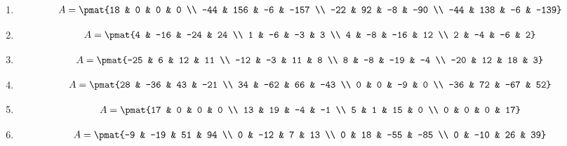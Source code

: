 \begin{enumerate}
\item

\begin{align*}
A = \pmat{18 & 0 & 0 & 0 \\ -44 & 156 & -6 & -157 \\ -22 & 92 & -8 & -90 \\ -44 & 138 & -6 & -139}
\end{align*}

\item

\begin{align*}
A = \pmat{4 & -16 & -24 & 24 \\ 1 & -6 & -3 & 3 \\ 4 & -8 & -16 & 12 \\ 2 & -4 & -6 & 2}
\end{align*}

\item

\begin{align*}
A = \pmat{-25 & 6 & 12 & 11 \\ -12 & -3 & 11 & 8 \\ 8 & -8 & -19 & -4 \\ -20 & 12 & 18 & 3}
\end{align*}

\item

\begin{align*}
A = \pmat{28 & -36 & 43 & -21 \\ 34 & -62 & 66 & -43 \\ 0 & 0 & -9 & 0 \\ -36 & 72 & -67 & 52}
\end{align*}

\item

\begin{align*}
A = \pmat{17 & 0 & 0 & 0 \\ 13 & 19 & -4 & -1 \\ 5 & 1 & 15 & 0 \\ 0 & 0 & 0 & 17}
\end{align*}

\item

\begin{align*}
A = \pmat{-9 & -19 & 51 & 94 \\ 0 & -12 & 7 & 13 \\ 0 & 18 & -55 & -85 \\ 0 & -10 & 26 & 39}
\end{align*}


\end{enumerate}
